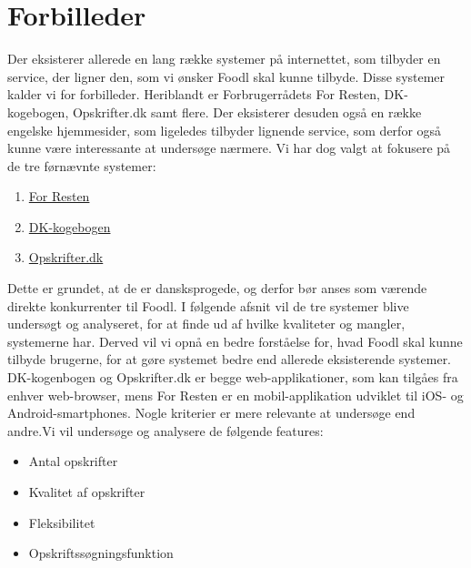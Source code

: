\section{Forbilleder}
Der eksisterer allerede en lang række systemer på internettet, som tilbyder en service, der ligner den, som vi ønsker Foodl skal kunne tilbyde. Disse systemer kalder vi for forbilleder. Heriblandt er Forbrugerrådets For Resten, DK-kogebogen, Opskrifter.dk samt flere. Der eksisterer desuden også en række engelske hjemmesider, som ligeledes tilbyder lignende service, som derfor også kunne være interessante at undersøge nærmere. Vi har dog valgt at fokusere på de tre førnævnte systemer: 

\begin{enumerate}[noitemsep]
  \item \href{https://play.google.com/store/apps/details?id=com.nodes.forresten}{For Resten} \cite{forresten}
  \item \href{http://www.dk-kogebogen.dk/}{DK-kogebogen} \cite{dkkogebogen}
  \item \href{http://opskrifter.dk/}{Opskrifter.dk} \cite{opskrifterdk}
\end{enumerate}

Dette er grundet, at de er dansksprogede, og derfor bør anses som værende direkte konkurrenter til Foodl. I følgende afsnit vil de tre systemer blive undersøgt og analyseret, for at finde ud af hvilke kvaliteter og mangler, systemerne har. Derved vil vi opnå en bedre forståelse for, hvad Foodl skal kunne tilbyde brugerne, for at gøre systemet bedre end allerede eksisterende systemer. DK-kogenbogen og Opskrifter.dk er begge web-applikationer, som kan tilgåes fra enhver web-browser, mens For Resten er en mobil-applikation udviklet til iOS- og Android-smartphones. Nogle kriterier er mere relevante at undersøge end andre.Vi vil undersøge og analysere de følgende features:

\begin{itemize}[noitemsep]
  \item Antal opskrifter
  \item Kvalitet af opskrifter
  \item Fleksibilitet
  \item Opskriftssøgningsfunktion
\end{itemize}

